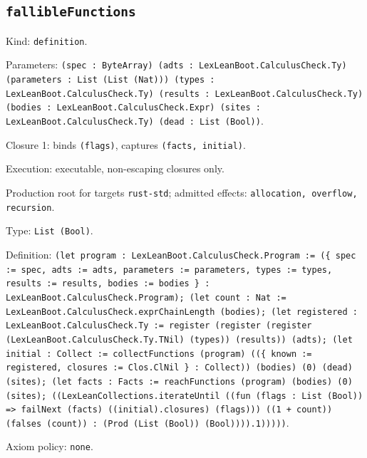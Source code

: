 \documentclass[11pt]{article}
\begin{document}
\subsection*{\texttt{fallibleFunctions}}
\noindent Kind: \texttt{definition}.\par
\noindent Parameters: \texttt{(spec : ByteArray) (adts : LexLeanBoot.CalculusCheck.Ty) (parameters : List (List (Nat))) (types : LexLeanBoot.CalculusCheck.Ty) (results : LexLeanBoot.CalculusCheck.Ty) (bodies : LexLeanBoot.CalculusCheck.Expr) (sites : LexLeanBoot.CalculusCheck.Ty) (dead : List (Bool))}.\par
\noindent Closure 1: binds \texttt{(flags)}, captures \texttt{(facts, initial)}.\par
\noindent Execution: executable, non-escaping closures only.\par
\noindent Production root for targets \texttt{rust-std}; admitted effects: \texttt{allocation, overflow, recursion}.\par
\noindent Type: \texttt{List (Bool)}.\par
\noindent Definition: \texttt{(let program : LexLeanBoot.CalculusCheck.Program := (\{ spec := spec, adts := adts, parameters := parameters, types := types, results := results, bodies := bodies \} : LexLeanBoot.CalculusCheck.Program); (let count : Nat := LexLeanBoot.CalculusCheck.exprChainLength (bodies); (let registered : LexLeanBoot.CalculusCheck.Ty := register (register (register (LexLeanBoot.CalculusCheck.Ty.TNil) (types)) (results)) (adts); (let initial : Collect := collectFunctions (program) ((\{ known := registered, closures := Clos.ClNil \} : Collect)) (bodies) (0) (dead) (sites); (let facts : Facts := reachFunctions (program) (bodies) (0) (sites); ((LexLeanCollections.iterateUntil ((fun (flags : List (Bool)) => failNext (facts) ((initial).closures) (flags))) ((1 + count)) (falses (count)) : (Prod (List (Bool)) (Bool)))).1)))))}.\par
\noindent Axiom policy: \texttt{none}.\par
\end{document}
